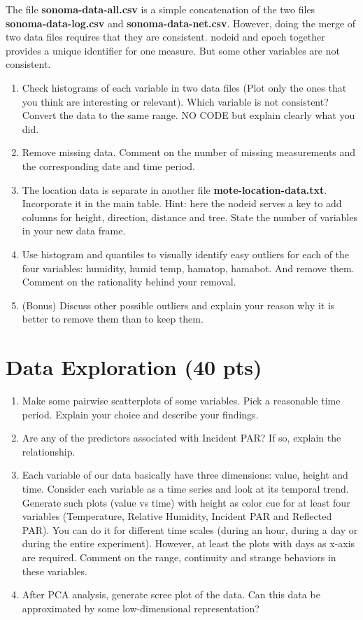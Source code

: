 \documentclass[11pt]{article}
\begin{document}
The file \textbf{sonoma-data-all.csv} is a simple concatenation of the two files  \textbf{sonoma-data-log.csv} and \textbf{sonoma-data-net.csv}. However, doing the merge of two data files requires that they are consistent. nodeid and epoch together provides a unique identifier for one measure. But some other variables are not consistent.  
\begin{enumerate}[label=(\alph*)]
\item Check histograms of each variable in two data files (Plot only the ones that you think are interesting or relevant). Which variable is not consistent? Convert the data to the same range. NO CODE but explain clearly what you did. 
\item Remove missing data. Comment on the number of missing measurements and the corresponding date and time period.
\item The location data is separate in another file \textbf{mote-location-data.txt}. Incorporate it in the main table. Hint: here the nodeid serves a key to add columns for height, direction, distance and tree. State the number of variables in your new data frame.
\item Use histogram and quantiles to visually identify easy outliers for each of the four variables: humidity, humid temp, hamatop, hamabot. And remove them. Comment on the rationality behind your removal.
\item (Bonus) Discuss other possible outliers and explain your reason why it is better to remove them than to keep them.
\end{enumerate}

\section{Data Exploration (40 pts)}
\begin{enumerate}[label=(\alph*)]
\item Make some pairwise scatterplots of some variables. Pick a reasonable time period. Explain your choice and describe your findings.
\item Are any of the predictors associated with Incident PAR? If so, explain the relationship.
\item Each variable of our data basically have three dimensions: value, height and time. Consider each variable as a time series and look at its temporal trend. Generate such plots (value vs time) with height as color cue for at least four variables (Temperature, Relative Humidity, Incident PAR and Reflected PAR). You can do it for different time scales (during an hour, during a day or during the entire experiment). However, at least the plots with days as x-axis are required. Comment on the range, continuity and strange behaviors in these variables.
\item After PCA analysis, generate scree plot of the data. Can this data be approximated by some low-dimensional representation? 
\end{enumerate}
\end{document}

